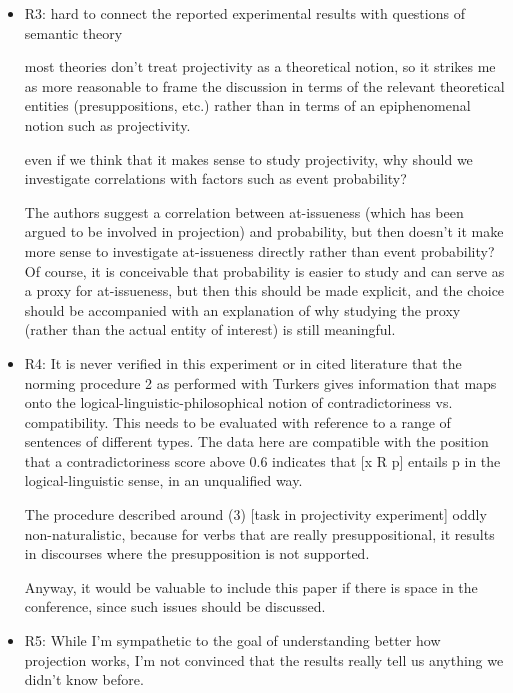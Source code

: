\documentclass[11pt,fleqn]{article}
\newcommand{\6}{\mbox{$[\hspace*{-.6mm}[$}}
\newcommand{\9}{\mbox{$]\hspace*{-.6mm}]$}}
\begin{document}
{\begin{itemize}
A poor choice of examples might explain the puzzling data about the discrepancy of between the two figures for the 'be right' construction. 

\item R3: hard to connect the reported experimental results with questions of semantic theory

most theories don't treat projectivity as a theoretical notion, so it strikes me as more reasonable to frame the discussion in terms of the relevant theoretical entities (presuppositions, etc.) rather than in terms of an epiphenomenal notion such as projectivity.

even if we think that it makes sense to study projectivity, why should we investigate correlations with factors such as event probability?

The authors suggest a correlation between at-issueness (which has been argued to be involved in projection) and probability, but then doesn't it make more sense to investigate at-issueness directly rather than event probability? Of course, it is conceivable that probability is easier to study and can serve as a proxy for at-issueness, but then this should be made explicit, and the choice should be accompanied with an explanation of why studying the proxy (rather than the actual entity of interest) is still meaningful.

\item R4: It is never verified in this experiment or in cited literature that the norming procedure 2 as performed with Turkers gives information that maps onto the logical-linguistic-philosophical notion of contradictoriness vs. compatibility.  This needs to be evaluated with reference to a range of sentences of different types.  The data here are compatible with the position that a contradictoriness score above 0.6 indicates that [x R p] entails p in the logical-linguistic sense, in an unqualified way.

The procedure described around (3) [task in projectivity experiment] oddly non-naturalistic, because for verbs that are really presuppositional, it results in discourses where the presupposition is not supported.

Anyway, it would be valuable to include this paper if there is space in the conference, since such issues should be discussed.

\item R5: While I’m sympathetic to the goal of understanding better how projection works, I’m not convinced that the results really tell us anything we didn’t know before.


\end{itemize}}
\end{document}
